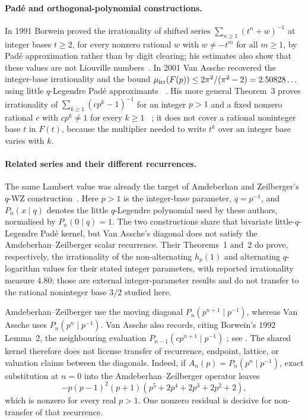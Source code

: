 \documentclass[11pt]{article}
\begin{document}
\paragraph{Pad\'e and orthogonal-polynomial constructions.}
In 1991
Borwein proved the irrationality of shifted series
$\sum_{n\ge1}(t^{n}+w)^{-1}$ at integer bases $t\ge2$, for every nonzero
rational $w$ with $w\ne-t^m$ for all $m\ge1$, by Pad\'e approximation rather
than by digit clearing; his estimates also show that these values are not
Liouville numbers~\cite[Thm.~4, pp.~257--258]{borwein1991}.  In 2001 Van
Assche recovered the integer-base irrationality and the bound
$\mu_{\rm irr}(F(p))\le 2\pi^2/(\pi^2-2)=2.50828\ldots$ using little $q$-Legendre
Pad\'e approximants
~\cite[Thm.~1, p.~10; proof pp.~10--11]{vanassche2001}.  His more general
Theorem~3 proves irrationality of
$\sum_{k\ge1}(cp^k-1)^{-1}$ for an integer $p>1$ and a fixed nonzero
rational $c$ with $cp^k\ne1$ for every $k\ge1$
~\cite[Thm.~3, p.~14]{vanassche2001}; it does not cover a
rational noninteger base $t$ in $F(t)$, because the multiplier needed to
write $t^k$ over an integer base varies with $k$.

\paragraph{Related series and their different recurrences.}
The same Lambert value was already the target of Amdeberhan and
Zeilberger's $q$-WZ construction~\cite{az1998}.  Here $p>1$ is the integer-base parameter, $q=p^{-1}$, and
$P_n(x\mid q)$ denotes the little $q$-Legendre polynomial used by these
authors, normalised by $P_n(0\mid q)=1$.  The two constructions
share that bivariate little-$q$-Legendre Pad\'e kernel, but Van Assche's
diagonal does not satisfy the Amdeberhan--Zeilberger scalar recurrence.
Their Theorems~1 and~2 do prove, respectively, the irrationality of the
non-alternating $h_p(1)$ and alternating $q$-logarithm values for their stated
integer parameters, with reported irrationality measure $4.80$; those are
external integer-parameter results and do not transfer to the rational
noninteger base $3/2$ studied here.

Amdeberhan--Zeilberger use the moving diagonal
$P_n(p^{n+1}\mid p^{-1})$, whereas Van Assche uses
$P_n(p^n\mid p^{-1})$.  Van Assche also records, citing
Borwein's 1992 Lemma~2, the neighbouring evaluation
$P_{n-1}(c p^{n+1}\mid p^{-1})$
\cite[(23) and the following paragraph, p.~6]{vanassche2001};
see \cite[Lemma~2, p.~143]{borwein1992}.
The shared kernel therefore does not license transfer of recurrence,
endpoint, lattice, or valuation claims between the diagonals.  Indeed, if
$A_n(p)=P_n(p^n\mid p^{-1})$, exact substitution at $n=0$ into the
Amdeberhan--Zeilberger operator \cite[Sec.~1.5, p.~2]{az1998} leaves
\[
 -p(p-1)^2(p+1)(p^5+2p^4+2p^3+2p^2+2),
\]
which is nonzero for every real $p>1$.  One nonzero residual is decisive for
non-transfer of that recurrence.
\end{document}
